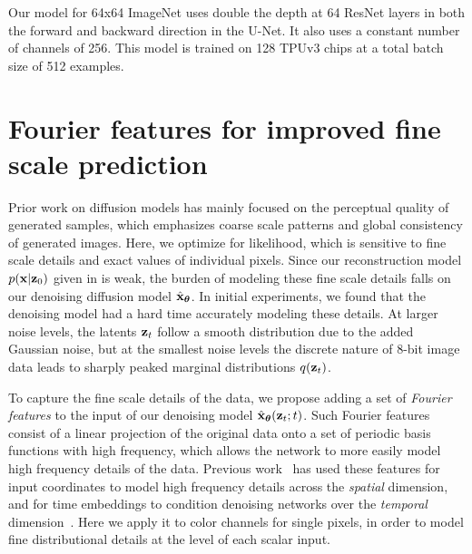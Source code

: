 \documentclass{article}
\begin{document}
Our model for 64x64 ImageNet uses double the depth at 64 ResNet layers in both the forward and backward direction in the U-Net. It also uses a constant number of channels of 256. This model is trained on 128 TPUv3 chips at a total batch size of 512 examples. %

\section{Fourier features for improved fine scale prediction}
\label{sec:fourier}
Prior work on diffusion models has mainly focused on the perceptual quality of generated samples, which emphasizes coarse scale patterns and global consistency of generated images. Here, we optimize for likelihood, which is sensitive to fine scale details and exact values of individual pixels. Since our reconstruction model $p({\mathbf{x}}|{\mathbf{z}}_{0})$ given in  is weak, the burden of modeling these fine scale details falls on our denoising diffusion model $\hat{{\mathbf{x}}}_{{\boldsymbol{\theta}}}$. In initial experiments, we found that the denoising model had a hard time accurately modeling these details. At larger noise levels, the latents ${\mathbf{z}}_t$ follow a smooth distribution due to the added Gaussian noise, but at the smallest noise levels the discrete nature of 8-bit image data leads to sharply peaked marginal distributions $q({\mathbf{z}}_t)$.%

%

To capture the fine scale details of the data, we propose adding a set of \emph{Fourier features} to the input of our denoising model $\hat{{\mathbf{x}}}_{{\boldsymbol{\theta}}}({\mathbf{z}}_t; t)$. Such Fourier features consist of a linear projection of the original data onto a set of periodic basis functions with high frequency, which allows the network to more easily model high frequency details of the data. Previous work~\citep{tancik2020fourier} has used these features for input coordinates to model high frequency details across the \emph{spatial} dimension, and for time embeddings to condition denoising networks over the \emph{temporal} dimension~\citep{song2020score}. Here we apply it to color channels for single pixels, in order to model fine distributional details at the level of each scalar input.
\end{document}
